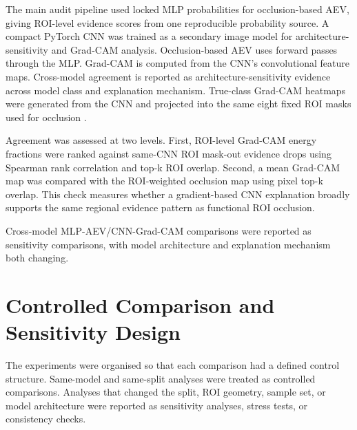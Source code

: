 The main audit pipeline used locked MLP probabilities for occlusion-based AEV, giving ROI-level evidence scores from one reproducible probability source. A compact PyTorch CNN was trained as a secondary image model for architecture-sensitivity and Grad-CAM analysis. Occlusion-based AEV uses forward passes through the MLP. Grad-CAM is computed from the CNN's convolutional feature maps. Cross-model agreement is reported as architecture-sensitivity evidence across model class and explanation mechanism. True-class Grad-CAM heatmaps were generated from the CNN and projected into the same eight fixed ROI masks used for occlusion  .


Agreement was assessed at two levels. First, ROI-level Grad-CAM energy fractions were ranked against same-CNN ROI mask-out evidence drops using Spearman rank correlation and top-k ROI overlap. Second, a mean Grad-CAM map was compared with the ROI-weighted occlusion map using pixel top-k overlap. This check measures whether a gradient-based CNN explanation broadly supports the same regional evidence pattern as functional ROI occlusion.

Cross-model MLP-AEV/CNN-Grad-CAM comparisons were reported as sensitivity comparisons, with model architecture and explanation mechanism both changing.


\section{Controlled Comparison and Sensitivity Design}

The experiments were organised so that each comparison had a defined control structure. Same-model and same-split analyses were treated as controlled comparisons. Analyses that changed the split, ROI geometry, sample set, or model architecture were reported as sensitivity analyses, stress tests, or consistency checks.


